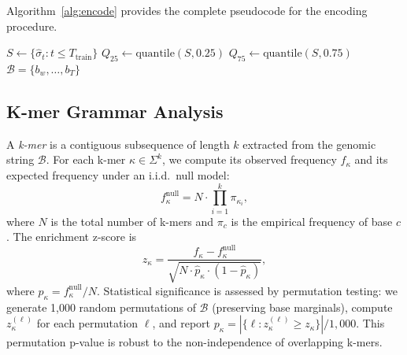 \documentclass[11pt]{article}
\begin{document}
Algorithm~\ref{alg:encode} provides the complete pseudocode for the
encoding procedure.

\begin{algorithm}[t]
\DontPrintSemicolon
\SetAlgoLined
{}
\BlankLine
{}
$S \leftarrow \{\hat{\sigma}_t : t \leq T_{\text{train}}\}$\;
$Q_{25} \leftarrow \mathrm{quantile}(S, 0.25)$\;
$Q_{75} \leftarrow \mathrm{quantile}(S, 0.75)$\;
\Return $\mathcal{B} = \{b_w, \ldots, b_T\}$\;
\caption{Volatility-Adaptive Alphabet Encoding}
\label{alg:encode}
\end{algorithm}

\subsection{K-mer Grammar Analysis}

A \emph{k-mer} is a contiguous subsequence of length $k$ extracted
from the genomic string $\mathcal{B}$.  For each k-mer $\kappa \in
\Sigma^k$, we compute its observed frequency $f_\kappa$ and its
expected frequency under an i.i.d.\ null model:
\begin{equation}
f_\kappa^{\text{null}} = N \cdot \prod_{i=1}^{k} \pi_{\kappa_i},
\label{eq:kmer_null}
\end{equation}
where $N$ is the total number of k-mers and $\pi_c$ is the empirical
frequency of base $c$.  The enrichment z-score is
\begin{equation}
z_\kappa = \frac{f_\kappa - f_\kappa^{\text{null}}}
{\sqrt{N \cdot \hat{p}_\kappa \cdot (1 - \hat{p}_\kappa)}},
\label{eq:zscore}
\end{equation}
where $\hat{p}_\kappa = f_\kappa^{\text{null}} / N$.  Statistical
significance is assessed by permutation testing: we generate 1,000
random permutations of $\mathcal{B}$ (preserving base marginals),
compute $z_\kappa^{(\ell)}$ for each permutation $\ell$, and report
$p_\kappa = |\{\ell : z_\kappa^{(\ell)} \geq z_\kappa\}| / 1{,}000$.
This permutation p-value is robust to the non-independence of
overlapping k-mers.
\end{document}
